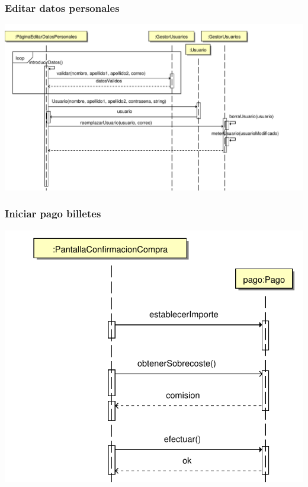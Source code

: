 \documentclass[11pt, a4paper, twoside, titlepage]{article}
\begin{document}
			\subsubsection{Editar datos personales}
				\begin{center}
					\includegraphics[scale=.6]{diseno/diagramas/editardatospersonales.pdf}
				\end{center}


			\subsubsection{Iniciar pago billetes}
				\begin{center}
					\includegraphics[scale=.6]{diseno/diagramas/iniciarpagobilletes.pdf}
				\end{center}
\end{document}
